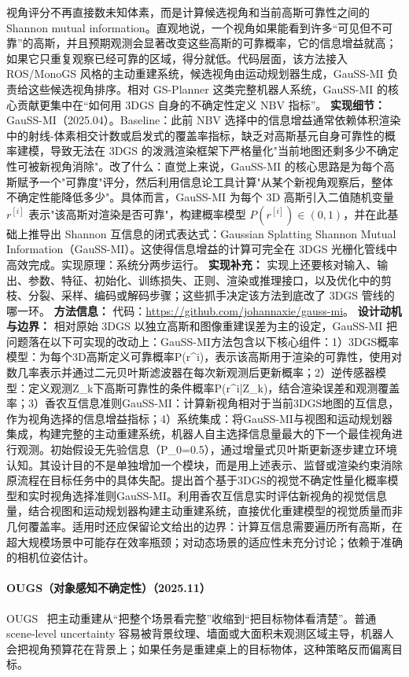 视角评分不再直接数未知体素，而是计算候选视角和当前高斯可靠性之间的 Shannon mutual information。直观地说，一个视角如果能看到许多“可见但不可靠”的高斯，并且预期观测会显著改变这些高斯的可靠概率，它的信息增益就高；如果它只重复观察已经可靠的区域，得分就低。代码层面，该方法接入 ROS/MonoGS 风格的主动重建系统，候选视角由运动规划器生成，GauSS-MI 负责给这些候选视角排序。相对 GS-Planner 这类完整机器人系统，GauSS-MI 的核心贡献更集中在“如何用 3DGS 自身的不确定性定义 NBV 指标”。
\textbf{实现细节：} GauSS-MI（2025.04）。Baseline：此前 NBV 选择中的信息增益通常依赖体积渲染中的射线-体素相交计数或启发式的覆盖率指标，缺乏对高斯基元自身可靠性的概率建模，导致无法在 3DGS 的泼溅渲染框架下严格量化"当前地图还剩多少不确定性可被新视角消除"。改了什么：直觉上来说，GauSS-MI 的核心思路是为每个高斯赋予一个"可靠度"评分，然后利用信息论工具计算"从某个新视角观察后，整体不确定性能降低多少"。具体而言，GauSS-MI 为每个 3D 高斯引入二值随机变量 $r^{[i]}$ 表示"该高斯对渲染是否可靠"，构建概率模型 $P(r^{[i]})\in(0,1)$，并在此基础上推导出 Shannon 互信息的闭式表达式：Gaussian Splatting Shannon Mutual Information（GauSS-MI）。这使得信息增益的计算可完全在 3DGS 光栅化管线中高效完成。实现原理：系统分两步运行。
\textbf{实现补充：} 实现上还要核对输入、输出、参数、特征、初始化、训练损失、正则、渲染或推理接口，以及优化中的剪枝、分裂、采样、编码或解码步骤；这些抓手决定该方法到底改了 3DGS 管线的哪一环。
\textbf{方法信息：} 代码：\url{https://github.com/johannaxie/gauss-mi}。
\textbf{设计动机与边界：} 相对原始 3DGS 以独立高斯和图像重建误差为主的设定，GauSS-MI 把问题落在以下可实现的改动上：GauSS-MI方法包含以下核心组件：1）3DGS概率模型：为每个3D高斯定义可靠概率P(r\^{}i)，表示该高斯用于渲染的可靠性，使用对数几率表示并通过二元贝叶斯滤波器在每次新观测后更新概率；2）逆传感器模型：定义观测Z\_k下高斯可靠性的条件概率P(r\^{}i|Z\_k)，结合渲染误差和观测覆盖率；3）香农互信息准则GauSS-MI：计算新视角相对于当前3DGS地图的互信息，作为视角选择的信息增益指标；4）系统集成：将GauSS-MI与视图和运动规划器集成，构建完整的主动重建系统，机器人自主选择信息量最大的下一个最佳视角进行观测。初始假设无先验信息（P\_0=0.5），通过增量式贝叶斯更新逐步建立环境认知。其设计目的不是单独增加一个模块，而是用上述表示、监督或渲染约束消除原流程在目标任务中的具体失配。提出首个基于3DGS的视觉不确定性量化概率模型和实时视角选择准则GauSS-MI。利用香农互信息实时评估新视角的视觉信息量，结合视图和运动规划器构建主动重建系统，直接优化重建模型的视觉质量而非几何覆盖率。适用时还应保留论文给出的边界：计算互信息需要遍历所有高斯，在超大规模场景中可能存在效率瓶颈；对动态场景的适应性未充分讨论；依赖于准确的相机位姿估计。
\paragraph{OUGS（对象感知不确定性）（2025.11）}
OUGS~\cite{2511_09397} 把主动重建从“把整个场景看完整”收缩到“把目标物体看清楚”。普通 scene-level uncertainty 容易被背景纹理、墙面或大面积未观测区域主导，机器人会把视角预算花在背景上；如果任务是重建桌上的目标物体，这种策略反而偏离目标。

